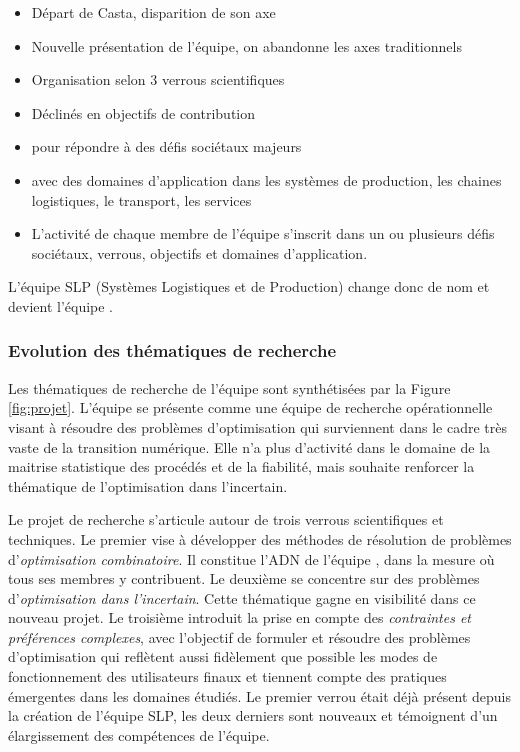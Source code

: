 		\begin{itemize}
			\item Départ de Casta, disparition de son axe
			\item Nouvelle présentation de l'équipe, on abandonne les axes traditionnels
			\item Organisation selon 3 verrous scientifiques 
			\item Déclinés en objectifs de contribution
			\item pour répondre à des défis sociétaux majeurs
			\item avec des domaines d'application dans les systèmes de production, les chaines logistiques, le transport, les services
			\item L'activité de chaque membre de l'équipe s'inscrit dans un ou plusieurs défis sociétaux, verrous, objectifs et domaines d'application. 
		\end{itemize}
		
		L'équipe SLP (Systèmes Logistiques et de Production) change donc de nom et devient l'équipe \slp. 
		
		
		
		\subsubsection{Evolution des thématiques de recherche}
		
		Les thématiques de recherche de l'équipe \slp sont synthétisées par la Figure \ref{fig:projet}. 
		L'équipe se présente comme une équipe de recherche opérationnelle visant à résoudre des problèmes d'optimisation qui surviennent dans le cadre très vaste de la transition numérique.
		Elle n'a plus d'activité dans le domaine de la maitrise statistique des procédés et de la fiabilité, mais souhaite renforcer la thématique de l'optimisation dans l'incertain.
		
 
	Le projet de recherche s'articule autour de trois verrous scientifiques et techniques. Le premier vise à développer des méthodes de résolution de problèmes d'\textit{optimisation combinatoire}. Il constitue l'ADN de l'équipe \slp, dans la mesure où tous ses membres y contribuent. 
	Le deuxième se concentre sur des problèmes d'\textit{optimisation dans l'incertain}.
	Cette thématique gagne en visibilité dans ce nouveau projet.
	Le troisième introduit la prise en compte des \textit{contraintes et préférences complexes}, avec l'objectif de formuler et résoudre des problèmes d'optimisation qui reflètent aussi fidèlement que possible les modes de fonctionnement des utilisateurs finaux et tiennent compte des pratiques émergentes dans les domaines étudiés.
	Le premier verrou était déjà présent depuis la création de l'équipe SLP, les deux derniers sont nouveaux et témoignent d'un élargissement des compétences de l'équipe.
	
